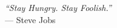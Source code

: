 \cleardoublepage
{}
\thispagestyle{empty}

\vspace*{3cm}

\begin{center}{
    \slshape
    ``Stay Hungry. Stay Foolish.''} \\
    \medskip
    --- Steve Jobs
\end{center}

\medskip
